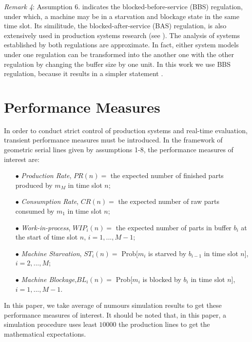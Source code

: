 \textsl{Remark 4}: Assumption 6. indicates the blocked-before-service (BBS) regulation, under which, a machine may be in a starvation and blockage state in the same time slot. Its similitude, the blocked-after-service (BAS) regulation, is also extensively used in production systems research (see \cite{dallery1992manufacturing, papadopoulos1996queueing,li2009throughput}). The analysis of systems established by both regulations are approximate. In fact, either system models under one regulation can be transformed into the another one with the other regulation by changing the buffer size by one unit. In this work we use BBS regulation, because it results in a simpler statement \cite{li2008production}.


\section{Performance Measures}
\label{performance measures}
\noindent In order to conduct strict control of production systems and real-time evaluation, transient performance measures must be introduced. In the framework of geometric serial lines given by assumptions 1-8, the performance measures of interest are:
\begin{itemize}
    \item[$\bullet$] \textsl{Production Rate}, $PR(n) = $ the expected number of finished parts produced by $m_M$ in time slot $n$;
    \item[$\bullet$] \textsl{Consumption Rate}, $CR(n)=$ the expected number of raw parts consumed by $m_1$ in time slot $n$;
    \item[$\bullet$] \textsl{Work-in-process}, $WIP_i(n)=$ the expected number of parts in buffer $b_i$ at the start of time slot $n$, $i=1,...,M-1$;
    \item[$\bullet$] \textsl{Machine Starvation}, $ST_i(n)=$ Prob[$m_i$ is starved by $b_{i-1}$ in time slot $n$], $i=2,...,M$;
    \item[$\bullet$] \textsl{Machine Blockage},$ BL_i(n)=$ Prob[$m_i$ is blocked by $b_i$ in time slot $n$], $ i=1,...,M-1$.
\end{itemize}
In this paper, we take average of numours simulation results to get these performance measures of interest. It should be noted that, in this paper, a simulation procedure uses least $10000$ the production lines to get the mathematical expectations.